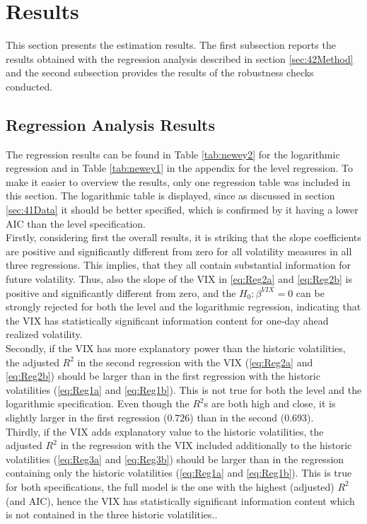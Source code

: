 
\section{Results}\label{sec:5Results}

This section presents the estimation results. The first subsection reports the results obtained with the regression analysis described in section \ref{sec:42Method} and the second subsection provides the results of the robustness checks conducted. 

\subsection{Regression Analysis Results}\label{sec:51Regression}
The regression results can be found in Table \ref{tab:newey2} for the logarithmic regression and in Table \ref{tab:newey1} in the appendix for the level regression. To make it easier to overview the results, only one regression table was included in this section. The logarithmic table is displayed, since as discussed in section \ref{sec:41Data} it should be better specified, which is confirmed by it having a lower AIC than the level specification.\\
Firstly, considering first the overall results, it is striking that the slope coefficients are positive and significantly different from zero for all volatility measures in all three regressions. This implies, that they all contain substantial information for future volatility. Thus, also the slope of the VIX in \ref{eq:Reg2a} and \ref{eq:Reg2b} is positive and significantly different from zero, and the $H_{0}: \beta^{VIX} = 0$ can be strongly rejected for both the level and the logarithmic regression, indicating that the VIX has statistically significant information content for one-day ahead realized volatility.\\
Secondly, if the VIX has more explanatory power than the historic volatilities, the adjusted $R^{2}$ in the second regression with the \ac{VIX} (\ref{eq:Reg2a} and \ref{eq:Reg2b}) should be larger than in the first regression with the historic volatilities (\ref{eq:Reg1a} and \ref{eq:Reg1b}). This is not true for both the level and the logarithmic specification. Even though the $R^{2}$s are both high and close, it is slightly larger in the first regression ($0.726$) than in the second ($0.693$).\\
Thirdly, if the VIX adds explanatory value to the historic volatilities, the adjusted $R^{2}$ in the regression with the VIX included additionally to the historic volatilities (\ref{eq:Reg3a} and \ref{eq:Reg3b}) should be larger than in the regression containing only the historic volatilities (\ref{eq:Reg1a} and \ref{eq:Reg1b}). This is true for both specifications, the full model is the one with the highest (adjusted) $R^{2}$ (and AIC), hence the VIX has statistically significant information content which is not contained in the three historic volatilities.. \\
